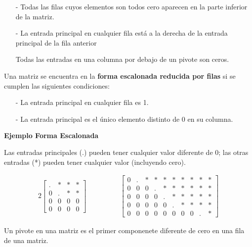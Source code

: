 \documentclass{article}
\begin{document}
\begin{tcolorbox}[colback=blue!10!white,colframe=blue!60!black,title=Propiedades de la Forma Escalonada]
    \begin{itemize}
        \item[-] Todas las filas cuyos elementos son todos cero aparecen en la parte inferior de la matriz.
        \item[-] La entrada principal en cualquier fila está a la derecha de la entrada principal de la fila anterior
        \item[] Todas las entradas en una columna por debajo de un pivote son ceros.
    \end{itemize}   
    Una matriz se encuentra en la \textbf{forma escalonada reducida por filas} si se cumplen las siguientes condiciones:
    \begin{itemize}
        \item[-] La entrada principal en cualquier fila es 1.
        \item[-] La entrada principal es el único elemento distinto de 0 en su columna.
    \end{itemize}    
\end{tcolorbox}

\begin{large}
    \textbf{Ejemplo Forma Escalonada}
\end{large}

Las entradas principales (.) pueden tener cualquier valor diferente de 0; las otras entradas (*) pueden tener cualquier valor (incluyendo cero).

\begin{alignat*}{2}
    \begin{bmatrix}
        .&*&*&*\\
        0&.&*&*\\
        0&0&0&0\\
        0&0&0&0
    \end{bmatrix}
    & \hspace{ 4em}%
    \begin{bmatrix}
        0&.&*&*&*&*&*&*&*&*\\
        0&0&0&.&*&*&*&*&*&*\\
        0&0&0&0&.&*&*&*&*&*\\
        0&0&0&0&0&.&*&*&*&*\\
        0&0&0&0&0&0&0&0&.&*
    \end{bmatrix}
\end{alignat*}

\begin{tcolorbox}[colback=green!20!white,colframe=green!80!black,title=Pivote]
    Un pivote en una matriz es el primer componenete diferente de cero en una fila de una matriz.
\end{tcolorbox}
\end{document}
